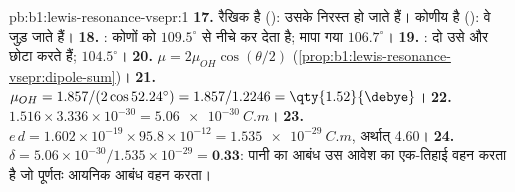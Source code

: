 \begin{solution}{pb:b1:lewis-resonance-vsepr:1}
\textbf{17.}  रैखिक है (): उसके  निरस्त हो जाते हैं।
 कोणीय है (): वे जुड़ जाते हैं।
\textbf{18.} :  कोणों को
$109.5^\circ$ से नीचे कर देता है; मापा गया $106.7^\circ$।
\textbf{19.} : दो  उसे और छोटा करते हैं; $104.5^\circ$।
\textbf{20.} $\mu = 2\mu_{OH}\cos(\theta/2)$
(\cref{prop:b1:lewis-resonance-vsepr:dipole-sum})।
\textbf{21.} $\mu_{OH} = 1.857/(2\cos 52.24^\circ) = 1.857/1.2246 =
\qty{1.52}{\debye}$।
\textbf{22.} $1.516 \times 3.336 \times 10^{-30} = \qty{5.06e-30}{C.m}$।
\textbf{23.} $e\,d = 1.602 \times 10^{-19} \times 95.8 \times 10^{-12} =
\qty{1.535e-29}{C.m}$, अर्थात् \qty{4.60}{\debye}।
\textbf{24.} $\delta = 5.06 \times 10^{-30}/1.535 \times 10^{-29} =
\textbf{0.33}$: पानी का  आबंध उस आवेश का एक-तिहाई वहन करता है
जो पूर्णतः आयनिक आबंध वहन करता।
\end{solution}
